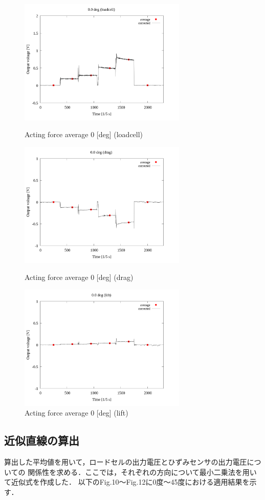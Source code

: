 \documentclass[twocolumn,a4j]{jsarticle}
\begin{document}
\begin{figure}[htbp]
    \footnotesize
    \begin{center}
        \includegraphics[width=80mm]{../images_2/03-1_loadcell/03_loadcell_average_0.png}
        \caption{Acting force average 0 [deg] (loadcell)}
        \includegraphics[width=80mm]{../images_2/03-2_drag/03_drag_average_0.png}
        \caption{Acting force average 0 [deg] (drag)}
        \includegraphics[width=80mm]{../images_2/03-3_lift/03_lift_average_0.png}
        \caption{Acting force average 0 [deg] (lift)}
    \end{center}
\end{figure}

\newpage

\subsection{近似直線の算出}
算出した平均値を用いて，ロードセルの出力電圧とひずみセンサの出力電圧についての
関係性を求める．ここでは，それぞれの方向について最小二乗法を用いて近似式を作成した．
以下のFig.10～Fig.12に0度～45度における適用結果を示す．
\end{document}
